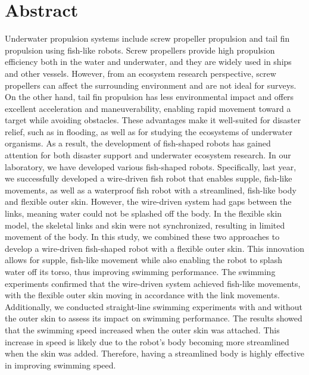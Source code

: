 \section*{Abstract}
Underwater propulsion systems include screw propeller propulsion and tail fin propulsion using fish-like robots. Screw propellers provide high propulsion efficiency 
both in the water and underwater, and they are widely used in ships and other vessels. However, from an ecosystem research perspective, screw propellers can affect 
the surrounding environment and are not ideal for surveys. On the other hand, tail fin propulsion has less environmental impact and offers excellent acceleration 
and maneuverability, enabling rapid movement toward a target while avoiding obstacles. These advantages make it well-suited for disaster relief, such as in flooding, 
as well as for studying the ecosystems of underwater organisms.
As a result, the development of fish-shaped robots has gained attention for both disaster support and underwater ecosystem research. In our laboratory, we have developed 
various fish-shaped robots. Specifically, last year, we successfully developed a wire-driven fish robot that enables supple, fish-like movements, as well as a waterproof 
fish robot with a streamlined, fish-like body and flexible outer skin. However, the wire-driven system had gaps between the links, meaning water could not be splashed off
 the body. In the flexible skin model, the skeletal links and skin were not synchronized, resulting in limited movement of the body.
In this study, we combined these two approaches to develop a wire-driven fish-shaped robot with a flexible outer skin. This innovation allows for supple, fish-like movement 
while also enabling the robot to splash water off its torso, thus improving swimming performance. The swimming experiments confirmed that the wire-driven system achieved
 fish-like movements, with the flexible outer skin moving in accordance with the link movements. Additionally, we conducted straight-line swimming experiments with and 
 without the outer skin to assess its impact on swimming performance. The results showed that the swimming speed increased when the outer skin was attached. This increase 
 in speed is likely due to the robot’s body becoming more streamlined when the skin was added. Therefore, having a streamlined body is highly effective in improving swimming 
 speed.